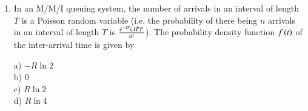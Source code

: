 \documentclass[journal]{IEEEtran}
\begin{document}
\begin{enumerate}
\begin{enumerate}
\end{enumerate}
\item In an M/M/I queuing system, the number of arrivals in an interval of length $T$ is a Poisson random variable (i.e. the probability of there being $n$ arrivals in an interval of length $T$ is $\frac{e^{-\lambda T}\left(\lambda T\right)^n}{n!}$). The probability density function $f\left(t\right)$ of the inter-arrival time is given by
\begin{multicols}{4}
     a) $-R\ln{2}$\\
     b) 0\\
     c) $R\ln{2}$\\
     d) $R \ln{4}$
 \end{multicols}
\end{enumerate}
\end{document}
